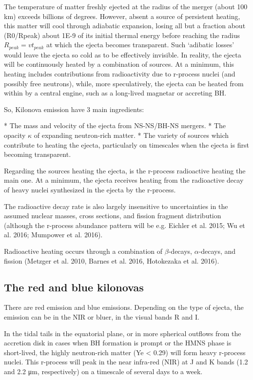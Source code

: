 The temperature of matter freshly ejected at the radius of the merger (about 100 km) exceeds billions of degrees. 
However, absent a source of persistent heating, this matter will cool through adiabatic expansion, losing all but a fraction about (R0/Rpeak) about 1E-9 of its initial thermal energy before reaching the radius $R_{peak} = v t_{peak}$ at which the ejecta becomes transparent.
Such `adibatic losses' would leave the ejecta so cold as to be effectively invisible.
In reality, the ejecta will be continuously heated by a combination of sources. 
At a minimum, this heating includes contributions from radioactivity due to r-process nuclei (and possibly free neutrons), while, more speculatively, the ejecta can be heated from within by a central engine, such as a long-lived magnetar or accreting BH.

So, Kilonova emission have 3 main ingredients:

* The mass and velocity of the ejecta from NS-NS/BH-NS mergers.
* The opacity $\kappa$ of expanding neutron-rich matter.
* The variety of sources which contribute to heating the ejecta, particularly on timescales when the ejecta is first becoming transparent.

Regarding the sources heating the ejecta, is the r-process radioactive heating the main one.
At a minimum, the ejecta receives heating from the radioactive decay of heavy nuclei synthesized in the ejecta by the r-process. 

The radioactive decay rate is also largely insensitive to uncertainties in the assumed nuclear masses, cross sections, and fission fragment distribution (although the r-process abundance pattern will be e.g. Eichler et al. 2015; Wu et al. 2016; Mumpower et al. 2016).

Radioactive heating occurs through a combination of $\beta$-decays, $\alpha$-decays, and fission (Metzger et al. 2010, Barnes et al. 2016, Hotokezaka et al. 2016). 

\subsection{The red and blue kilonovas}

There are red emission and blue emissions.
Depending on the type of ejecta, the emission can be in the NIR or bluer, in the visual bands R and I.

In the tidal tails in the equatorial plane, or in more spherical outflows from the accretion disk in cases when BH formation is prompt or the HMNS phase is short-lived, the highly neutron-rich matter (Ye < 0.29) will form heavy r-process nuclei.
This r-process will peak in the near infra-red (NIR) at J and K bands (1.2 and 2.2 μm, respectively) on a timescale of several days to a week.

